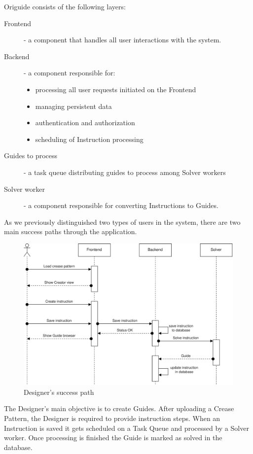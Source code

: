 Origuide consists of the following layers:
\begin{description}
	\item[Frontend] - a component that handles all user interactions with the system. 
	\item[Backend] - a component responsible for: \begin{itemize}
		\item processing all user requests initiated on the Frontend
		\item managing persistent data 
		\item authentication and authorization
		\item scheduling of Instruction processing
	\end{itemize}
	\item[Guides to process] - a task queue distributing guides to process among Solver workers
	\item[Solver worker] - a component responsible for converting Instructions to Guides.
\end{description}

As we previously distinguished two types of users in the system, there are two main success paths through the application.

\begin{figure}[H]
	\caption{Designer's success path}
  \centering
    \includegraphics[width=\textwidth]{assets/3-designer-flow.png}
\end{figure}

The Designer's main objective is to create Guides. After uploading a Crease Pattern, the Designer is required to provide instruction steps. When an Instruction is saved it gets scheduled on a Task Queue and processed by a Solver worker. Once processing is finished the Guide is marked as solved in the database.

